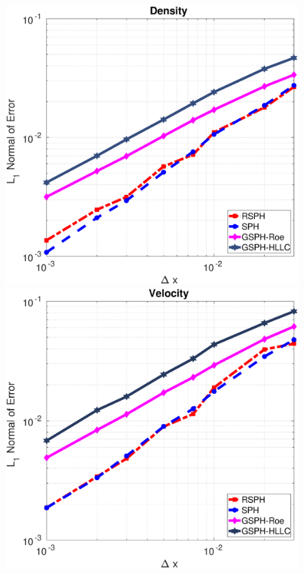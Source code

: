 \begin{figure}[H]
    \centering
    \begin{minipage}{.332\textwidth}
        \centering
        \includegraphics[width=0.99 \textwidth]{Chapter-4/Figures/Accuracy-des}
    \end{minipage}%
    \begin{minipage}{.332 \textwidth}
        \centering
        \includegraphics[width=0.99 \textwidth]{Chapter-4/Figures/Accuracy-vel}

\end{minipage}
\end{figure}
